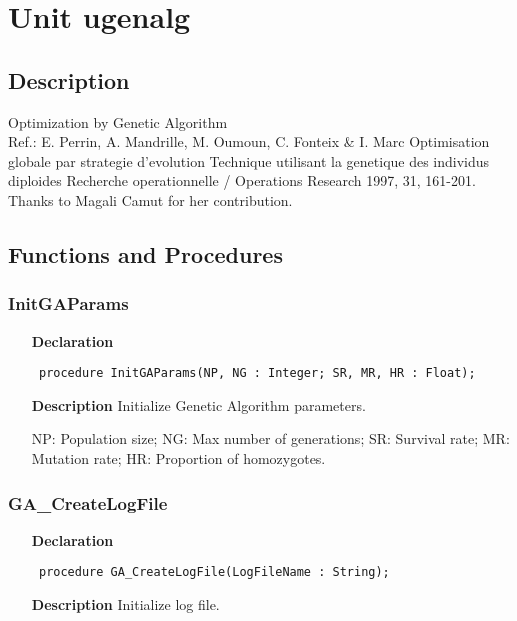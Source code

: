 \documentclass[12pt,a4paper,oneside]{report}
\newcommand{\declarationitem}[1]{\textbf{#1}}
\newcommand{\descriptiontitle}[1]{\textbf{#1}}
\newcommand{\code}[1]{\texttt{#1}}
\begin{document}
\section{Unit ugenalg}
\label{ugenalg}
\subsection{Description}
Optimization by Genetic Algorithm\\ 
Ref.: E. Perrin, A. Mandrille, M. Oumoun, C. Fonteix {\&} I. Marc Optimisation globale par strategie d'evolution Technique utilisant la genetique des individus diploides Recherche operationnelle / Operations Research 1997, 31, 161{-}201.\\
Thanks to Magali Camut for her contribution.
\subsection{Functions and Procedures}
\subsubsection{InitGAParams}
\label{ugenalg-InitGAParams}
\begin{itemize}\item[\declarationitem{Declaration}\hfill]
	\begin{flushleft}
		\code{
			procedure InitGAParams(NP, NG : Integer; SR, MR, HR : Float);}
		
	\end{flushleft}
	
	\par
	\item[\descriptiontitle{Description}]
	Initialize Genetic Algorithm parameters.
	
	NP: Population size; NG: Max number of generations; SR: Survival rate; MR: Mutation rate; HR: Proportion of homozygotes.
	
\end{itemize}
\subsubsection{GA{\_}CreateLogFile}
\label{ugenalg-GA_CreateLogFile}
\begin{itemize}\item[\declarationitem{Declaration}\hfill]
	\begin{flushleft}
		\code{
			procedure GA{\_}CreateLogFile(LogFileName : String);}
		
	\end{flushleft}
	
	\par
	\item[\descriptiontitle{Description}]
	Initialize log file.
	
\end{itemize}
\end{document}
